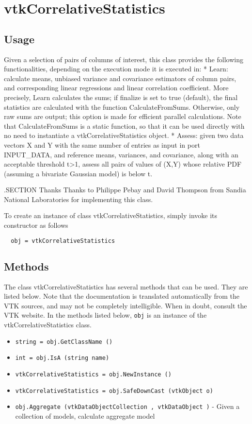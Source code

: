 \section{vtkCorrelativeStatistics}

\subsection{Usage}

 Given a selection of pairs of columns of interest, this class provides the
 following functionalities, depending on the execution mode it is executed in:
 * Learn: calculate means, unbiased variance and covariance estimators of
   column pairs, and corresponding linear regressions and linear correlation 
   coefficient. More precisely, Learn calculates the sums; if  finalize
   is set to true (default), the final statistics are calculated with the 
   function CalculateFromSums. Otherwise, only raw sums are output; this 
   option is made for efficient parallel calculations.
   Note that CalculateFromSums is a static function, so that it can be used
   directly with no need to instantiate a vtkCorrelativeStatistics object.
 * Assess: given two data vectors X and Y with the same number of entries as
   input in port INPUT\_DATA, and reference means, variances, and covariance, along
   with an acceptable threshold t>1, assess all pairs of values of (X,Y) 
   whose relative PDF (assuming a bivariate Gaussian model) is below t.
  
 .SECTION Thanks
 Thanks to Philippe Pebay and David Thompson from Sandia National Laboratories 
 for implementing this class.

To create an instance of class vtkCorrelativeStatistics, simply
invoke its constructor as follows
\begin{verbatim}
  obj = vtkCorrelativeStatistics
\end{verbatim}
\subsection{Methods}

The class vtkCorrelativeStatistics has several methods that can be used.
  They are listed below.
Note that the documentation is translated automatically from the VTK sources,
and may not be completely intelligible.  When in doubt, consult the VTK website.
In the methods listed below, \verb|obj| is an instance of the vtkCorrelativeStatistics class.
\begin{itemize}
\item  \verb|string = obj.GetClassName ()|

\item  \verb|int = obj.IsA (string name)|

\item  \verb|vtkCorrelativeStatistics = obj.NewInstance ()|

\item  \verb|vtkCorrelativeStatistics = obj.SafeDownCast (vtkObject o)|

\item  \verb|obj.Aggregate (vtkDataObjectCollection , vtkDataObject )| -  Given a collection of models, calculate aggregate model

\end{itemize}
